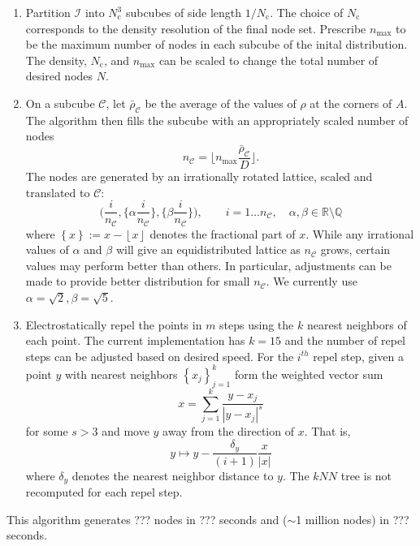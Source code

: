 \documentclass[10pt]{amsart}
\newcommand{\cube}{\mathcal{C}}
\begin{document}
\begin{enumerate}
	
	\item Partition $\mathcal{I}$ into $N_\text{c}^3$ subcubes of side length $1/N_\text{c}$. The choice of $N_\text{c}$ corresponds to the  density resolution of the final node set. Prescribe $n_\text{max}$ to be the maximum number of nodes in each subcube of the inital distribution. 
	The density, $N_\text{c}$, and $n_\text{max}$ can be scaled to change the total number of desired nodes $N$. 
	
	\item On a subcube $\cube$, let $\bar{\rho}_\cube$ be the average of the values of $\rho$ at the corners of $A$. The algorithm then fills the subcube with an appropriately scaled number of nodes 
	\[  n_\cube = \lfloor  n_\text{max}\frac{ \bar{\rho}_\cube }{D} \rfloor.  \] 
	The nodes are generated by an irrationally rotated lattice,  scaled and translated to $\cube$:
	\[\bigg(\frac{i}{n_\cube}, \bigg\{\alpha\frac{i}{n_\cube}\bigg\}, \bigg\{\beta\frac{i}{n_\cube}\bigg\}\bigg), \qquad i=1\dots n_\cube, \quad  \alpha, \beta\in\mathbb{R}\setminus\mathbb{Q}\]
	where $\left\{x\right\}:= x-\left\lfloor x\right\rfloor$ denotes the fractional part of $x$. While any irrational values of $\alpha$ and $\beta$ will give an equidistributed lattice as $n_\cube$ grows, certain values  may perform better than others. In particular, adjustments can be made to provide better distribution for small $n_\cube$. We currently use $\alpha = \sqrt{2}, \beta = \sqrt{5}$.
	
	\item Electrostatically repel the points in $m$ steps using the $k$ nearest neighbors of each point. The current implementation has $k=15$ and the number of repel steps can be adjusted based on desired speed. For the $i^{th}$ repel step, given a point $y$ with nearest neighbors $\left\{x_j\right\}_{j=1}^k$ form the weighted vector sum
	\[x = \sum_{j=1}^{k}\frac{y-x_j}{|y-x_j|^s} \]
	for some $s>3$ and move $y$ away from the direction of $x$. That is,
	\[y\mapsto y - \frac{\delta_y}{(i+1)}\frac{x}{|x|}\]
	where $\delta_y$ denotes the nearest neighbor distance to $y$. The $kNN$ tree is not recomputed for each repel step.
\end{enumerate}
This algorithm generates ??? nodes in ??? seconds and ($ \sim $1 million nodes) in ??? seconds.
\end{document}
